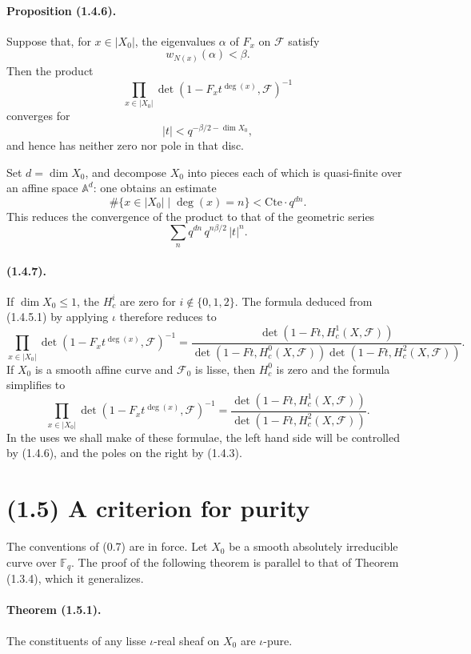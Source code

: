 \documentclass[11pt]{article}
\theoremstyle{remark}
\newcommand{\Fq}{\mathbb{F}_q}
\begin{document}
\paragraph{Proposition (1.4.6).} Suppose that, for $x\in |X_0|$, the eigenvalues $\alpha$ of $F_x$ on $\mathcal F$ satisfy
\[
w_{N(x)}(\alpha)<\beta.
\]
Then the product
\[
\prod_{x\in |X_0|}\det(1-F_x t^{\deg(x)},\mathcal F)^{-1}
\]
converges for
\[
|t|<q^{-\beta/2-\dim X_0},
\]
and hence has neither zero nor pole in that disc.

Set $d=\dim X_0$, and decompose $X_0$ into pieces each of which is quasi-finite over an affine space $\mathbb A^d$: one obtains an estimate
\[
\#\{x\in |X_0|\mid \deg(x)=n\}<\mathrm{Cte}\cdot q^{dn}.
\]
This reduces the convergence of the product to that of the geometric series
\[
\sum_n q^{dn}\,q^{n\beta/2}\,|t|^n.
\]

\paragraph{(1.4.7).} If $\dim X_0\le 1$, the $H^i_c$ are zero for $i\notin\{0,1,2\}$. The formula deduced from (1.4.5.1) by applying $\iota$ therefore reduces to
\begin{equation}\tag{1.4.7.1}
\prod_{x\in |X_0|}\det(1-F_x t^{\deg(x)},\mathcal F)^{-1}
=
\frac{\det(1-Ft,H^1_c(X,\mathcal F))}
{\det(1-Ft,H^0_c(X,\mathcal F))\det(1-Ft,H^2_c(X,\mathcal F))}.
\end{equation}
If $X_0$ is a smooth affine curve and $\mathcal F_0$ is lisse, then $H^0_c$ is zero and the formula simplifies to
\begin{equation}\tag{1.4.7.2}
\prod_{x\in |X_0|}\det(1-F_x t^{\deg(x)},\mathcal F)^{-1}
=
\frac{\det(1-Ft,H^1_c(X,\mathcal F))}
{\det(1-Ft,H^2_c(X,\mathcal F))}.
\end{equation}
In the uses we shall make of these formulae, the left hand side will be controlled by (1.4.6), and the poles on the right by (1.4.3).



\section*{(1.5) A criterion for purity}

The conventions of (0.7) are in force. Let $X_0$ be a smooth absolutely irreducible curve over $\Fq$. The proof of the following theorem is parallel to that of Theorem (1.3.4), which it generalizes.

\paragraph{Theorem (1.5.1).} The constituents of any lisse $\iota$-real sheaf on $X_0$ are $\iota$-pure.
\end{document}
